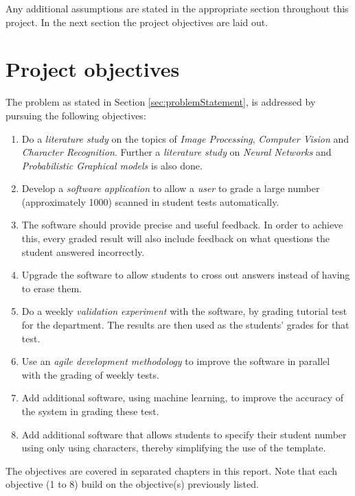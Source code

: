 Any additional assumptions are stated in the appropriate section throughout this project. In the next section the project objectives are laid out.


\section{Project objectives}
\label{sec:Objectives}

The problem as stated in Section \ref{sec:problemStatement}, is addressed by pursuing the following objectives:
\begin{enumerate}
  \item Do a \textsl{literature study} on the topics of \textsl{Image Processing}, \textsl{Computer Vision} and \textsl{Character Recognition}. Further a \textsl{literature study} on \textsl{Neural Networks} and \textsl{Probabilistic Graphical models} is also done.
  \item Develop a \textsl{software application} to allow a \textsl{user} to grade a large number (approximately 1000) scanned in student tests automatically.
\item The software should provide precise and useful feedback. In order to achieve this, every graded result will also include feedback on what questions the student answered incorrectly.
\item Upgrade the software to allow students to cross out answers instead of having to erase them.
  \item Do a weekly \textsl{validation experiment} with the software, by grading tutorial test for the department. The results are then used as the students' grades for that test.
  \item Use an \textsl{agile development methodology} to improve the software in parallel with the grading of weekly tests.
  \item Add additional software, using machine learning, to improve the accuracy of the system in grading these test.
  \item Add additional software that allows students to specify their student number using only using characters, thereby simplifying the use of the template.
\end{enumerate}

The objectives are covered in separated chapters in this report. Note that each objective (1 to 8) build on the objective(s) previously listed.


